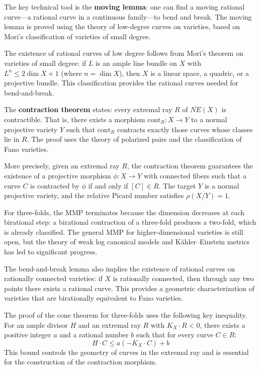 The key technical tool is the \textbf{moving lemma}: one can find a moving
rational curve---a rational curve in a continuous family---to bend and break.
The moving lemma is proved using the theory of low-degree curves on varieties,
based on Mori's classification of varieties of small degree.

The existence of rational curves of low degree follows from Mori's theorem on
varieties of small degree: if $L$ is an ample line bundle on $X$ with
$L^n \leq 2\dim X + 1$ (where $n = \dim X$), then $X$ is a linear space, a
quadric, or a projective bundle. This classification provides the rational
curves needed for bend-and-break.

The \textbf{contraction theorem} states: every extremal ray $R$ of
$\overline{NE}(X)$ is contractible. That is, there exists a morphism
$\text{cont}_R: X \to Y$ to a normal projective variety $Y$ such that
$\text{cont}_R$ contracts exactly those curves whose classes lie in $R$. The
proof uses the theory of polarized pairs and the classification of Fano
varieties.

More precisely, given an extremal ray $R$, the contraction theorem guarantees
the existence of a projective morphism $\phi: X \to Y$ with connected fibers
such that a curve $C$ is contracted by $\phi$ if and only if $[C] \in R$. The
target $Y$ is a normal projective variety, and the relative Picard number
satisfies $\rho(X/Y) = 1$.

For three-folds, the MMP terminates because the dimension decreases at each
birational step: a birational contraction of a three-fold produces a two-fold,
which is already classified. The general MMP for higher-dimensional varieties
is still open, but the theory of weak log canonical models and K\"ahler--Einstein
metrics has led to significant progress.

The bend-and-break lemma also implies the existence of rational curves on
rationally connected varieties: if $X$ is rationally connected, then through
any two points there exists a rational curve. This provides a geometric
characterization of varieties that are birationally equivalent to Fano varieties.

The proof of the cone theorem for three-folds uses the following key inequality.
For an ample divisor $H$ and an extremal ray $R$ with $K_X \cdot R < 0$,
there exists a positive integer $a$ and a rational number $b$ such that for
every curve $C \in R$:
\[
H \cdot C \leq a(-K_X \cdot C) + b
\]
This bound controls the geometry of curves in the extremal ray and is essential
for the construction of the contraction morphism.

